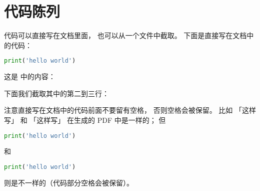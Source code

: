 
\section{代码陈列}

代码可以直接写在文档里面，
也可以从一个文件中截取。
下面是直接写在文档中的代码：
\begin{lstlisting}[language=python]
print('hello world')
\end{lstlisting}
这是  中的内容：

下面我们截取其中的第二到三行：


注意直接写在文档中的代码前面不要留有空格，
否则空格会被保留。
比如
「这样写」
和
                                    「这样写」
在生成的 PDF 中是一样的；
但
\begin{lstlisting}[language=python]
print('hello world')
\end{lstlisting}
和
    \begin{lstlisting}[language=python]
    print('hello world')
    \end{lstlisting}
则是不一样的（代码部分空格会被保留）。


